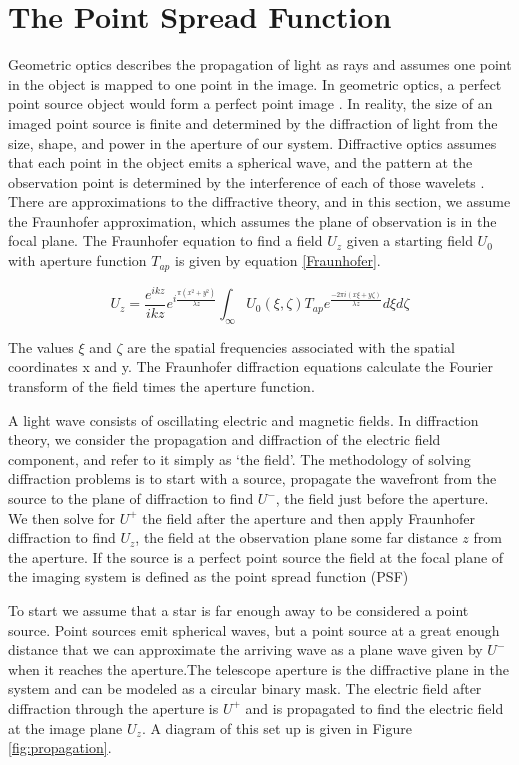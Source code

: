 \section{The Point Spread Function}

 Geometric optics describes the propagation of light as rays and assumes one point in the object is mapped to one point in the image. In geometric optics, a perfect point source object would form a perfect point image \citep{hecht2002optics}. In reality, the size of an imaged point source is finite and determined by the diffraction of light from the size, shape, and power in the aperture of our system. Diffractive optics assumes that each point in the object emits a spherical wave, and the pattern at the observation point is determined by the interference of each of those wavelets \citep{goodman2005introduction}. There are approximations to the diffractive theory, and in this section, we assume the Fraunhofer approximation, which assumes the plane of observation is in the focal plane. The Fraunhofer equation to find a field $U_z$ given a starting field $U_0$ with aperture function $T_{ap}$ is given by equation \ref{Fraunhofer}.

\begin{equation}
U_z=\frac{e^{ikz}}{ikz}e^{i\frac{\pi (x^2+y^2)}{\lambda z}}\int_{\infty} U_0(\xi,\zeta)T_{ap}e^{\frac{-2\pi i(x\xi+y\zeta)}{\lambda z}}d\xi d\zeta
\label{Fraunhofer}
\end{equation}

The values $\xi$ and $\zeta$ are the spatial frequencies associated with the spatial coordinates x and y. The Fraunhofer diffraction equations calculate the Fourier transform of the field times the aperture function.

A light wave consists of oscillating electric and magnetic fields. In diffraction theory, we consider the propagation and diffraction of the electric field component, and refer to it simply as `the field'. The methodology of solving diffraction problems is to start with a source, propagate the wavefront from the source to the plane of diffraction to find $U^-$, the field just before the aperture. We then solve for $U^+$ the field after the aperture and then apply Fraunhofer diffraction to find $U_z$, the field at the observation plane some far distance $z$ from the aperture. If the source is a perfect point source the field at the focal plane of the imaging system is defined as the point spread function (PSF)

To start we assume that a star is far enough away to be considered a point source. Point sources emit spherical waves, but a point source at a great enough distance that we can approximate the arriving wave as a plane wave given by $U^-$ when it reaches the aperture.The telescope aperture is the diffractive plane in the system and can be modeled as a circular binary mask. The electric field after diffraction through the aperture is $U^+$ and is propagated to find the electric field at the image plane $U_z$. A diagram of this set up is given in Figure \ref{fig:propagation}. 

